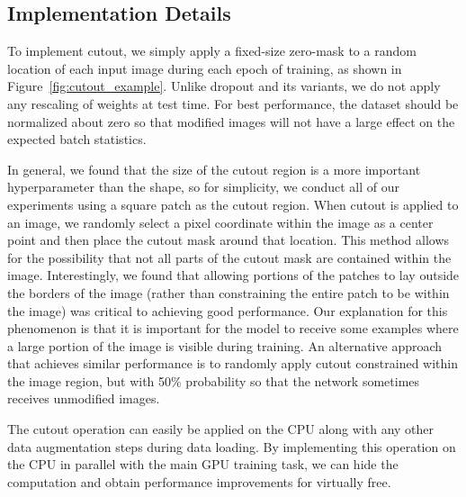 \documentclass[10pt,twocolumn,letterpaper]{article}
\begin{document}
\subsection{Implementation Details}
\label{details}

To implement cutout, we simply apply a fixed-size zero-mask to a random location of each input image during each epoch of training, as shown in Figure~\ref{fig:cutout_example}. Unlike dropout and its variants, we do not apply any rescaling of weights at test time. For best performance, the dataset should be normalized about zero so that modified images will not have a large effect on the expected batch statistics.

In general, we found that the size of the cutout region is a more important hyperparameter than the shape, so for simplicity, we conduct all of our experiments using a square patch as the cutout region. When cutout is applied to an image, we randomly select a pixel coordinate within the image as a center point and then place the cutout mask around that location. This method allows for the possibility that not all parts of the cutout mask are contained within the image. Interestingly, we found that allowing portions of the patches to lay outside the borders of the image (rather than constraining the entire patch to be within the image) was critical to achieving good performance. Our explanation for this phenomenon is that it is important for the model to receive some examples where a large portion of the image is visible during training. An alternative approach that achieves similar performance is to randomly apply cutout constrained within the image region, but with 50\% probability so that the network sometimes receives unmodified images.

The cutout operation can easily be applied on the CPU along with any other data augmentation steps during data loading.  By implementing this operation on the CPU in parallel with the main GPU training task, we can hide the computation and obtain performance improvements for virtually free.

\end{document}
